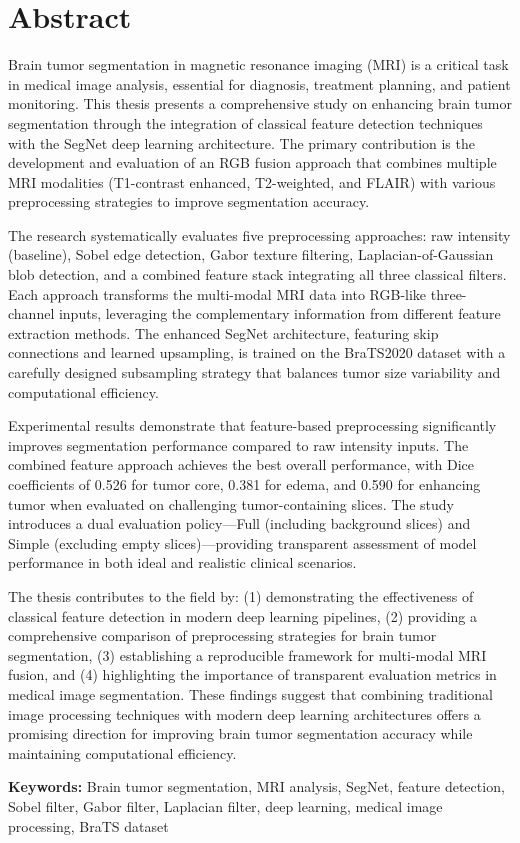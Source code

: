 \chapter*{Abstract}
Brain tumor segmentation in magnetic resonance imaging (MRI) is a critical task in medical image analysis, essential for diagnosis, treatment planning, and patient monitoring. This thesis presents a comprehensive study on enhancing brain tumor segmentation through the integration of classical feature detection techniques with the SegNet deep learning architecture. The primary contribution is the development and evaluation of an RGB fusion approach that combines multiple MRI modalities (T1-contrast enhanced, T2-weighted, and FLAIR) with various preprocessing strategies to improve segmentation accuracy.

The research systematically evaluates five preprocessing approaches: raw intensity (baseline), Sobel edge detection, Gabor texture filtering, Laplacian-of-Gaussian blob detection, and a combined feature stack integrating all three classical filters. Each approach transforms the multi-modal MRI data into RGB-like three-channel inputs, leveraging the complementary information from different feature extraction methods. The enhanced SegNet architecture, featuring skip connections and learned upsampling, is trained on the BraTS2020 dataset with a carefully designed subsampling strategy that balances tumor size variability and computational efficiency.

Experimental results demonstrate that feature-based preprocessing significantly improves segmentation performance compared to raw intensity inputs. The combined feature approach achieves the best overall performance, with Dice coefficients of 0.526 for tumor core, 0.381 for edema, and 0.590 for enhancing tumor when evaluated on challenging tumor-containing slices. The study introduces a dual evaluation policy—Full (including background slices) and Simple (excluding empty slices)—providing transparent assessment of model performance in both ideal and realistic clinical scenarios.

The thesis contributes to the field by: (1) demonstrating the effectiveness of classical feature detection in modern deep learning pipelines, (2) providing a comprehensive comparison of preprocessing strategies for brain tumor segmentation, (3) establishing a reproducible framework for multi-modal MRI fusion, and (4) highlighting the importance of transparent evaluation metrics in medical image segmentation. These findings suggest that combining traditional image processing techniques with modern deep learning architectures offers a promising direction for improving brain tumor segmentation accuracy while maintaining computational efficiency.

\textbf{Keywords:} Brain tumor segmentation, MRI analysis, SegNet, feature detection, Sobel filter, Gabor filter, Laplacian filter, deep learning, medical image processing, BraTS dataset